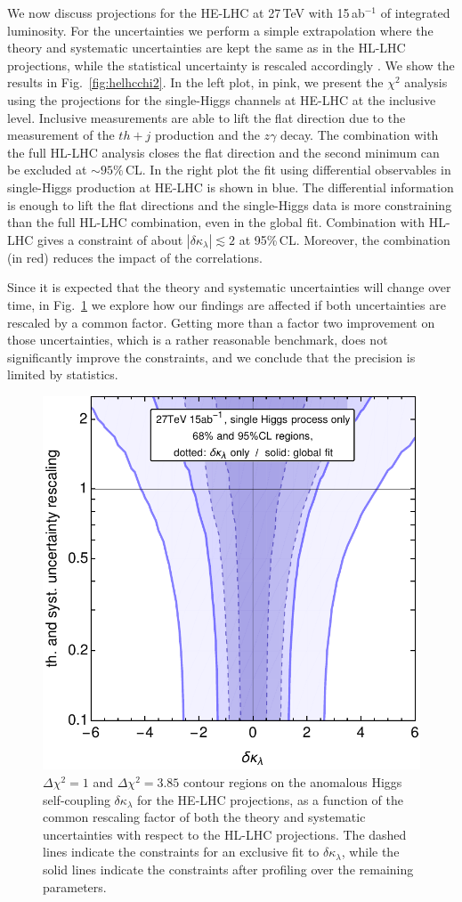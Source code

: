 We now discuss projections for the HE-LHC at 27\,TeV with 15\,ab$^{-1}$ of integrated luminosity. For the uncertainties we perform a simple extrapolation where the theory and systematic uncertainties are kept the same as in the HL-LHC projections, while the statistical uncertainty is rescaled accordingly \cite{Goncalves:2018qas}. We show the results in Fig.~\ref{fig:helhcchi2}. In the left plot, in pink, we present the $\chi^2$ analysis using the projections for the single-Higgs channels at HE-LHC at the inclusive level. Inclusive measurements are able to lift the flat direction due to the measurement of the $th+j$ production and the $z\gamma$ decay. The combination with the full HL-LHC analysis closes the flat direction and the second minimum can be excluded at $\sim 95\%$\,CL. In the right plot the fit using differential observables in single-Higgs production at HE-LHC is shown in blue. The differential information is enough to lift the flat directions and the single-Higgs data is more constraining than the full HL-LHC combination, even in the global fit. Combination with HL-LHC gives a constraint of about $|\delta \kappa_\lambda |\lesssim  2$ at 95\%\,CL. Moreover, the combination (in red) reduces the impact of the correlations.
\medskip

Since it is expected that the theory and systematic uncertainties will change over time, in Fig.~\ref{fig:helhcrescaling} we explore how our findings are affected if both uncertainties are rescaled by a common factor. Getting more than a factor two improvement on those uncertainties, which is a rather reasonable benchmark, does not significantly improve the constraints, and we conclude that the precision is limited by statistics.	
	
\begin{figure}[h]
\centering
\includegraphics[width=0.4\linewidth]{section3/plots/helhcrescaling}
\caption{$\Delta\chi^2=1$ and $\Delta\chi^2=3.85$ contour regions on the anomalous Higgs self-coupling $\delta \kappa_\lambda$ for the HE-LHC projections, as a function of the common rescaling factor of both the theory and systematic uncertainties with respect to the HL-LHC projections. The dashed lines indicate the constraints for an exclusive fit to $\delta\kappa_\lambda$, while the solid lines indicate the constraints after profiling over the remaining parameters.}
\label{fig:helhcrescaling}
\end{figure}